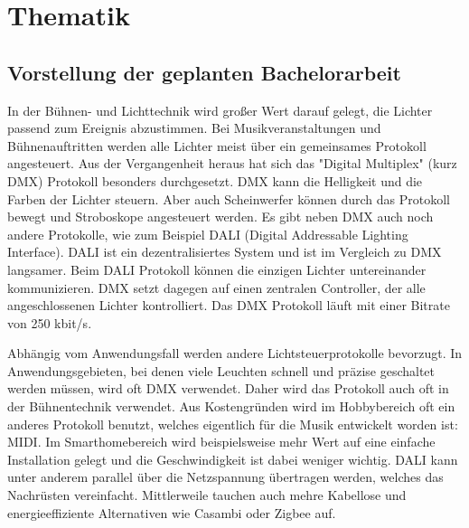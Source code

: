 
\chapter{Thematik} %

\label{ChapterThematik} %



\section{Vorstellung der geplanten Bachelorarbeit}

In der Bühnen- und Lichttechnik wird großer Wert darauf gelegt, die Lichter passend zum Ereignis abzustimmen. Bei Musikveranstaltungen und Bühnenauftritten werden alle Lichter meist über ein gemeinsames Protokoll angesteuert. Aus der Vergangenheit heraus hat sich das "Digital Multiplex" (kurz DMX) Protokoll besonders durchgesetzt. DMX kann die Helligkeit und die Farben der Lichter steuern. Aber auch Scheinwerfer können durch das Protokoll bewegt und Stroboskope angesteuert werden. Es gibt neben DMX auch noch andere Protokolle, wie zum Beispiel DALI (Digital Addressable Lighting Interface). DALI ist ein dezentralisiertes System und ist im Vergleich zu DMX langsamer. Beim DALI Protokoll können die einzigen Lichter untereinander kommunizieren.  DMX setzt dagegen auf einen zentralen Controller, der alle angeschlossenen Lichter kontrolliert. Das DMX Protokoll läuft mit einer Bitrate von 250 kbit/s.

Abhängig vom Anwendungsfall werden andere Lichtsteuerprotokolle bevorzugt. In Anwendungsgebieten, bei denen viele Leuchten schnell und präzise geschaltet werden müssen, wird oft DMX verwendet. Daher wird das Protokoll auch oft in der Bühnentechnik verwendet. Aus Kostengründen wird im Hobbybereich oft ein anderes Protokoll benutzt, welches eigentlich für die Musik entwickelt worden ist: MIDI. Im Smarthomebereich wird beispielsweise mehr Wert auf eine einfache Installation gelegt und die Geschwindigkeit ist dabei weniger wichtig. DALI kann unter anderem parallel über die Netzspannung übertragen werden, welches das Nachrüsten vereinfacht. Mittlerweile tauchen auch mehre Kabellose und energieeffiziente Alternativen wie Casambi oder Zigbee auf.

